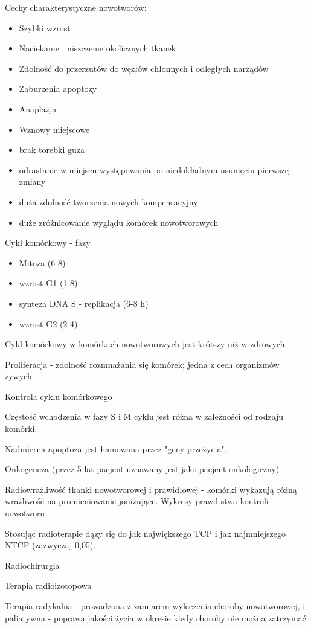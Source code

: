 \documentclass{article}
\begin{document}
Cechy charakterystyczne nowotworów:
\begin{itemize}
    \item Szybki wzrost
    \item Naciekanie i niszczenie okolicznych tkanek
    \item Zdolność do przerzutów do węzłów chłonnych i odległych narządów
    \item Zaburzenia apoptozy
    \item Anaplazja
    \item Wznowy miejscowe
    \item brak torebki guza
    \item odrastanie w miejscu występowania po niedokładnym usunięciu pierwszej zmiany
    \item duża zdolność tworzenia nowych kompensacyjny
    \item duże zróżnicowanie wyglądu komórek nowotworowych
\end{itemize}

Cykl komórkowy - fazy
\begin{itemize}
    \item Mitoza (6-8)
    \item wzrost G1 (1-8)
    \item synteza DNA S - replikacja (6-8 h)
    \item wzrost G2 (2-4)
\end{itemize}

Cykl komórkowy w komórkach nowotworowych jest krótszy niż w zdrowych.

Proliferacja - zdolność rozmnażania się komórek; jedna z cech organizmów żywych

Kontrola cyklu komórkowego

Częstość wchodzenia w fazy S i M cyklu jest różna w zależności od rodzaju komórki.

Nadmierna apoptoza jest hamowana przez "geny przeżycia".

Onkogeneza (przez 5 lat pacjent uznawany jest jako pacjent onkologiczny)

Radiowrażliwość tkanki nowotworowej i prawidłowej - komórki wykazują różną wrażliwość na promieniowanie jonizujące. Wykresy prawd-stwa kontroli nowotworu

Stosując radioterapie dązy się do jak największego TCP i jak najmniejszego NTCP (zazwyczaj 0,05).

Radiochirurgia

Terapia radioizotopowa

Terapia radykalna - prowadzona z zamiarem wyleczenia choroby nowotworowej, i paliatywna - poprawa jakości życia w okresie kiedy choroby nie można zatrzymać
\end{document}
